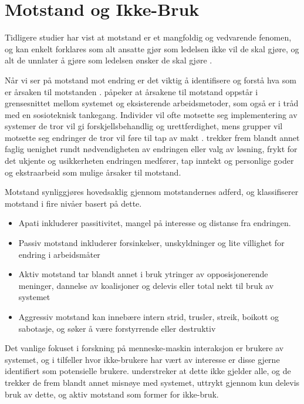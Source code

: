 \section{Motstand og Ikke-Bruk}
\label{sec:motstand}

Tidligere studier har vist at motstand er et mangfoldig og vedvarende fenomen, og kan enkelt forklares som alt ansatte gjør som ledelsen ikke vil de skal gjøre, og alt de unnlater å gjøre som ledelsen ønsker de skal gjøre \citep{Timmons03}. 

\noindent
Når vi ser på motstand mot endring er det viktig å identifisere og forstå hva som er årsaken til motstanden \citep{Lapointe05}. \citet{Timmons03} påpeker at årsakene til motstand oppstår i grensesnittet mellom systemet og eksisterende arbeidsmetoder, som også er i tråd med en sosioteknisk tankegang. Individer vil ofte motsette seg implementering av systemer de tror vil gi forskjellsbehandlig og urettferdighet, mens grupper vil motsette seg endringer de tror vil føre til tap av makt \citep{Lapointe05}. \citet{Jacobsen12} trekker frem blandt annet faglig uenighet rundt nødvendigheten av endringen eller valg av løsning, frykt for det ukjente og usikkerheten endringen medfører, tap inntekt og personlige goder og ekstraarbeid som mulige årsaker til motstand.

\noindent
Motstand synliggjøres hovedsaklig gjennom motstandernes adferd, og \citet{Lapointe05} klassifiserer motstand i fire nivåer basert på dette.

\begin{itemize}
\item Apati inkluderer passitivitet, mangel på interesse og distanse fra endringen.
\item Passiv motstand inkluderer forsinkelser, unskyldninger og lite villighet for endring i arbeidsmåter
\item Aktiv motstand tar blandt annet i bruk ytringer av opposisjonerende meninger, dannelse av koalisjoner og delevis eller total nekt til bruk av systemet
\item Aggressiv motstand kan innebære intern strid, trusler, streik, boikott og sabotasje, og søker å være forstyrrende eller destruktiv
\end{itemize}

\noindent
Det vanlige fokuset i forskning på menneske-maskin interaksjon er brukere av systemet, og i tilfeller hvor ikke-brukere har vært av interesse er disse gjerne identifiert som potensielle brukere. 
\citet{Satchell09} understreker at dette ikke gjelder alle, og de trekker de frem blandt annet misnøye med systemet, uttrykt gjennom kun delevis bruk av dette, og aktiv motstand som former for ikke-bruk.

